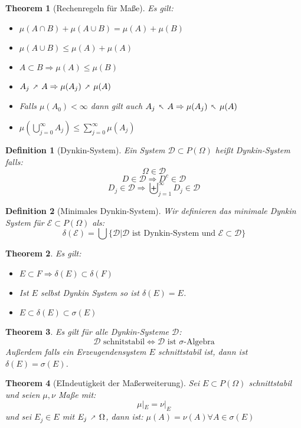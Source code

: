 \documentclass[10pt,a4paper]{article}
\makeatletter
\newtheorem{theorem}{Theorem}
\newtheorem{definition}{Definition}
\newcommand{\fixed@sra}{$\vrule height 2\fontdimen22\textfont2 width 0pt\shortrightarrow$}
\newcommand{\shortarrow}[1]{%
	\mathrel{\text{\rotatebox[origin=c]{\numexpr#1*45}{\fixed@sra}}}
}
\makeatother
\begin{document}
\begin{theorem}[Rechenregeln für Maße]
	Es gilt:
	\begin{itemize}
		\item $\mu(A \cap B) + \mu(A \cup B) = \mu(A) + \mu(B)$
		\item $\mu(A\cup B) \leq \mu(A) + \mu(A)$
		\item $A\subset B \Rightarrow \mu(A) \leq \mu(B)$
		\item $A_j \shortarrow{1} A \Rightarrow \mu(A_j) \shortarrow{1} \mu(A)$
		\item Falls $\mu(A_0) < \infty$ dann gilt auch $A_j \shortarrow{3}A \Rightarrow \mu(A_j) \shortarrow{3}\mu(A)$
		\item $\mu(\bigcup_{j=0}^\infty A_j) \leq \sum_{j=0}^{\infty}\mu(A_j)$
	\end{itemize}
\end{theorem}
\begin{definition}[Dynkin-System]
	Ein System $\mathcal{D}\subset P(\Omega)$ heißt Dynkin-System falls:
	$$\Omega \in \mathcal{D}$$
	$$D \in \mathcal{D} \Rightarrow D^c \in \mathcal{D}$$
	$$D_j \in \mathcal{D} \Rightarrow\biguplus_{j=1}^\infty D_j \in \mathcal{D}$$
\end{definition}
\begin{definition}[Minimales Dynkin-System]
	Wir definieren das minimale Dynkin System für $\mathcal{E} \subset P(\Omega)$ als:
	$$\delta(\mathcal{E}) = \bigcup\{\mathcal{D}| \mathcal{D} \text{ ist Dynkin-System und } \mathcal{E} \subset \mathcal{D}\}$$
\end{definition}
\begin{theorem}
	Es gilt:
	\begin{itemize}
		\item $E \subset F \Rightarrow \delta(E) \subset \delta(F)$
		\item Ist $E$ selbst Dynkin System so ist $\delta(E) = E$.
		\item $E \subset \delta(E) \subset \sigma(E)$
	\end{itemize}
\end{theorem}
\begin{theorem}
	Es gilt für alle Dynkin-Systeme $\mathcal{D}$:
	$$\mathcal{D} \text{ schnitstabil} \iff \mathcal{D} \text{ ist }\sigma\text{-Algebra}$$
	Außerdem falls ein Erzeugendensystem $E$ schnittstabil ist, dann ist $\delta(E) = \sigma(E)$.
\end{theorem}
\begin{theorem}[EIndeutigkeit der Maßerweiterung]
	Sei $E\subset P(\Omega)$ schnittstabil und seien $\mu, \nu$ Maße mit:
	$$\mu|_E = \nu|_E$$
	und sei $E_j \in E$ mit $E_j\shortarrow{1} \Omega$, dann ist:
	$\mu(A) = \nu(A) \forall A \in \sigma(E)$
\end{theorem}
\end{document}
